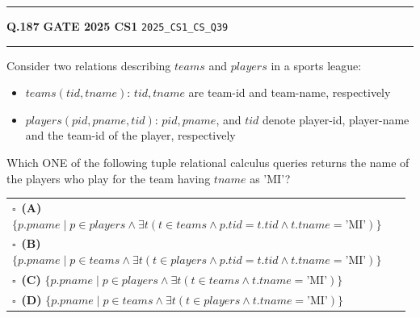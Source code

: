\documentclass[a4paper,10pt]{article}
\begin{document}
\vspace{6pt}\hrule height 0.35pt\vspace{6pt}
\noindent
\begin{tcolorbox}[
    blanker,
    sidebyside,
    sidebyside align=top,
    lefthand width=0.55\textwidth,
    top=4pt, bottom=4pt, left=0pt, right=0pt,
    middle=16pt,
    underlay={
        \draw[dashed, black!80, line width=0.8pt, dash pattern=on 4pt off 3pt]
            ([xshift=0.55\textwidth+8pt]frame.north west) --
            ([xshift=0.55\textwidth+8pt]frame.south west);
    }
]
\textbf{Q.187}  \hfill {\footnotesize\textbf{GATE 2025 CS1} \quad \tiny\texttt{2025\_CS1\_CS\_Q39}}
\vspace{2pt}\hrule height 0.3pt\vspace{4pt}

Consider two relations describing $teams$ and $players$ in a sports league:
\begin{itemize}
\item $teams(tid, tname)$: $tid, tname$ are team-id and team-name, respectively
\item $players(pid, pname, tid)$: $pid, pname$, and $tid$ denote player-id, player-name and the team-id of the player, respectively
\end{itemize}
Which ONE of the following tuple relational calculus queries returns the name of the players who play for the team having $tname$ as 'MI'?

\par\vspace{6pt}\noindent
\begin{tabular}{@{}p{0.98\linewidth}@{}}
$\square$\ \textbf{(A)} $\{ p.pname \mid p \in players \land \exists t (t \in teams \land p.tid = t.tid \land t.tname = \text{'MI'}) \}$ \\
\addlinespace[3pt]
$\square$\ \textbf{(B)} $\{ p.pname \mid p \in teams \land \exists t (t \in players \land p.tid = t.tid \land t.tname = \text{'MI'}) \}$ \\
\addlinespace[3pt]
$\square$\ \textbf{(C)} $\{ p.pname \mid p \in players \land \exists t (t \in teams \land t.tname = \text{'MI'}) \}$ \\
\addlinespace[3pt]
$\square$\ \textbf{(D)} $\{ p.pname \mid p \in teams \land \exists t (t \in players \land t.tname = \text{'MI'}) \}$
\end{tabular}

\tcblower


\end{tcolorbox}
\end{document}
